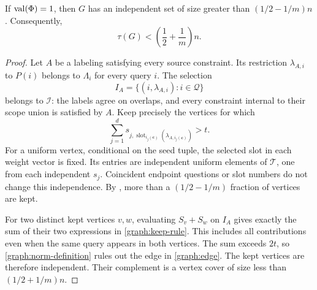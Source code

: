 \begin{proposition}[Completeness]\label{graph:completeness}
If $\operatorname{val}(\Phi)=1$, then $G$ has an independent set of size greater
than $(1/2-1/m)n$.  Consequently,
\[
 \tau(G)<\left(\frac12+\frac1m\right)n.
\]
\end{proposition}
\begin{proof}
Let $A$ be a labeling satisfying every source constraint.  Its
restriction $\lambda_{A,i}$ to $P(i)$ belongs to $\Lambda_i$ for
every query $i$.  The selection
\[
 I_A=\{(i,\lambda_{A,i}):i\in\mathcal Q\}
\]
belongs to $\mathcal I$: the labels agree on overlaps, and every
constraint internal to their scope union is satisfied by $A$.
Keep precisely the vertices for which
\begin{equation}\label{graph:keep-rule}
 \sum_{j=1}^d
 s_{j,\operatorname{slot}_{i_j(\mathbf c)}
                  (\lambda_{A,i_j(\mathbf c)})}>t.
\end{equation}
For a uniform vertex, conditional on the seed tuple, the selected
slot in each weight vector is fixed.  Its entries are independent
uniform elements of $\mathcal T$, one from each independent $s_j$.
Coincident endpoint questions or slot numbers do not change this
independence.  By , more than a
$(1/2-1/m)$ fraction of vertices are kept.

For two distinct kept vertices $v,w$, evaluating $S_v+S_w$ on $I_A$
gives exactly the sum of their two expressions in
\eqref{graph:keep-rule}.  This includes all contributions even when
the same query appears in both vertices.  The sum exceeds $2t$, so
\eqref{graph:norm-definition} rules out the edge in
\eqref{graph:edge}.  The kept vertices are therefore independent.
Their complement is a vertex cover of size less than
$(1/2+1/m)n$.
\end{proof}
